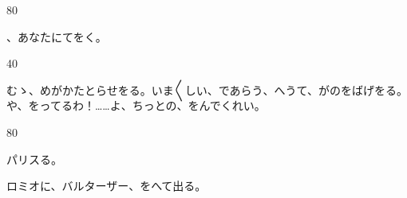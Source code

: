 \documentclass[tate,paper=b6j,jafontsize=9pt]{jlreq}
\begin{document}
\begin{azconvIndented}{8\zw}{0\zw}

、あなたにてをく。

\end{azconvIndented}
\begin{azconvIndented}{4\zw}{0\zw}

むゝ、めがかたとらせをる。いま{〳〵}しい、であらう、へうて、がのをばげをる。や、をってるわ！……よ、ちっとの、をんでくれい。

\end{azconvIndented}
\begin{azconvIndented}{8\zw}{0\zw}

パリスる。

ロミオに、バルターザー、をへて出る。

\end{azconvIndented}
\end{document}
